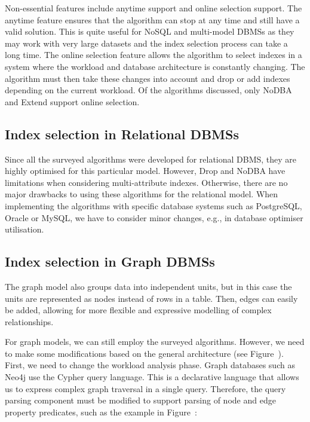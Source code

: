 Non-essential features include anytime support and online selection support. The anytime feature ensures that the algorithm can stop at any time and still have a valid solution. This is quite useful for NoSQL and multi-model DBMSs as they may work with very large datasets and the index selection process can take a long time. The online selection feature allows the algorithm to select indexes in a system where the workload and database architecture is constantly changing. The algorithm must then take these changes into account and drop or add indexes depending on the current workload. Of the algorithms discussed, only NoDBA and Extend support online selection.

\subsection{Index selection in Relational DBMSs}
Since all the surveyed algorithms were developed for relational DBMS, they are highly optimised for this particular model. However, Drop and NoDBA have limitations when considering multi-attribute indexes. Otherwise, there are no major drawbacks to using these algorithms for the relational model. When implementing the algorithms with specific database systems such as PostgreSQL, Oracle or MySQL, we have to consider minor changes, e.g., in database optimiser utilisation.

\subsection{Index selection in Graph DBMSs}
The graph model also groups data into independent units, but in this case the units are represented as nodes instead of rows in a table. Then, edges can easily be added, allowing for more flexible and expressive modelling of complex relationships. 

For graph models, we can still employ the surveyed algorithms. However, we need to make some modifications based on the general architecture (see Figure~). First, we need to change the workload analysis phase. Graph databases such as Neo4j use the Cypher query language. This is a declarative language that allows us to express complex graph traversal in a single query. %
Therefore, the query parsing component must be modified to support parsing of node and edge property predicates, such as the example in Figure~:


